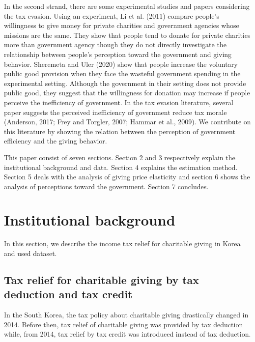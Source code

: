 \documentclass[
]{article}
\begin{document}
In the second strand, there are some experimental studies and papers considering the tax evasion. Using an experiment, Li et al. (2011) compare people's willingness to give money for private charities and government agencies whose missions are the same. They show that people tend to donate for private charities more than government agency though they do not directly investigate the relationship between people's perception toward the government and giving behavior. Sheremeta and Uler (2020) show that people increase the voluntary public good provision when they face the wasteful government spending in the experimental setting. Although the government in their setting does not provide public good, they suggest that the willingness for donation may increase if people perceive the inefficiency of government. In the tax evasion literature, several paper suggests the perceived inefficiency of government reduce tax morale (Anderson, 2017; Frey and Torgler, 2007; Hammar et al., 2009). We contribute on this literature by showing the relation between the perception of government efficiency and the giving behavior.

This paper consist of seven sections. Section 2 and 3 respectively explain the institutional background and data. Section 4 explains the estimation method. Section 5 deals with the analysis of giving price elasticity and section 6 shows the analysis of perceptions toward the government. Section 7 concludes.

\hypertarget{institutional-background}{%
\section{Institutional background}\label{institutional-background}}

In this section, we describe the income tax relief for charitable giving in Korea and used dataset.

\hypertarget{tax-relief-for-charitable-giving-by-tax-deduction-and-tax-credit}{%
\subsection{Tax relief for charitable giving by tax deduction and tax credit}\label{tax-relief-for-charitable-giving-by-tax-deduction-and-tax-credit}}

In the South Korea, the tax policy about charitable giving drastically changed in 2014. Before then, tax relief of charitable giving was provided by tax deduction while, from 2014, tax relief by tax credit was introduced instead of tax deduction.
\end{document}
